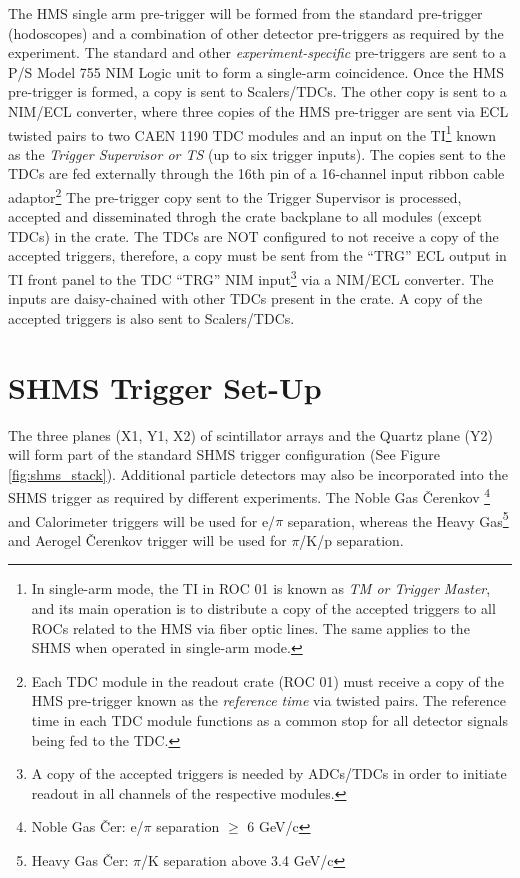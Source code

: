 \documentclass[11pt]{article}
\begin{document}
\indent The HMS single arm pre-trigger will be formed from the standard pre-trigger (hodoscopes) and a combination of other detector pre-triggers as required by the
experiment. The standard and other \textit{experiment-specific} pre-triggers are sent to a P/S  Model 755 NIM Logic unit to form a single-arm coincidence.
Once the HMS pre-trigger is formed, a copy is sent to Scalers/TDCs. The other copy is sent to a NIM/ECL converter, where three copies of the HMS pre-trigger are sent
via ECL twisted pairs to two CAEN 1190 TDC modules and an input on the TI\footnote{In single-arm mode, the TI in ROC 01 is known as \textit{TM or Trigger Master}, and its main operation is to distribute a copy
of the accepted triggers to all ROCs related to the HMS via fiber optic lines. The same applies to the SHMS when operated in single-arm mode.} known as the \textit{Trigger Supervisor or TS} (up to six trigger inputs). The copies sent to
the TDCs are fed externally through the 16th pin of a 16-channel input ribbon cable adaptor\footnote{Each TDC module in the readout crate (ROC 01) must receive a copy of the HMS pre-trigger known as
the \textit{reference time} via twisted pairs. The reference time in each TDC module functions as a common stop for all detector signals being fed to the TDC.} The pre-trigger
copy sent to the Trigger Supervisor is processed, accepted and disseminated throgh the crate backplane to all modules (except TDCs) in the crate. The TDCs are NOT configured to not receive a copy
of the accepted triggers, therefore, a copy must be sent from the ``TRG'' ECL output in TI front panel to the TDC ``TRG'' NIM input\footnote{A copy of the accepted triggers is needed by ADCs/TDCs in order to initiate
readout in all channels of the respective modules.} via a NIM/ECL converter. The inputs are daisy-chained
with other TDCs present in the crate. A copy of the accepted triggers is also sent to Scalers/TDCs.

\section{SHMS Trigger Set-Up}
\indent The three planes (X1, Y1, X2) of scintillator arrays and the Quartz plane (Y2) will form part of the standard SHMS trigger configuration (See Figure \ref{fig:shms_stack}).  
Additional particle detectors may also be incorporated into the SHMS trigger as required by different experiments. The Noble Gas \v{C}erenkov \footnote{Noble Gas \v{C}er: e/$\pi$ separation $\geq$ 6 GeV/c} and
Calorimeter triggers will be used for e/$\pi$ separation, whereas the Heavy Gas\footnote{Heavy Gas \v{C}er: $\pi$/K separation above 3.4 GeV/c} and Aerogel \v{C}erenkov trigger will be used for $\pi$/K/p
separation\cite{SHMS_PID}. 
\end{document}
